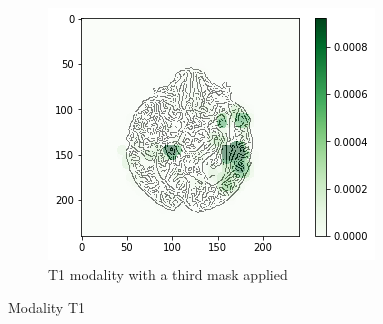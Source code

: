\begin{figure}[H]
    \begin{subfigure}[t]{.45\textwidth}
        \centering
        \includegraphics[width=\linewidth]{chapters/06_hdm/a_Brats18_TCIA02_491_1_L2/4.png}
        \caption{T1 modality with a third mask applied}
    \end{subfigure}
    \caption{Modality T1}
\end{figure}


